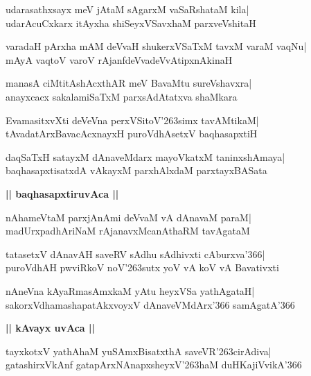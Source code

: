 \documentclass[twoside,12pt,openright]{book}
\def\S{\char'263}
\newcounter{shloka}[chapter]
\def\uvaca#1{\centerline{{\large\textbf{#1}}}}
\begin{document}
\begin{shloka}%
udarasathxsayx meV jAtaM sAgarxM vaSaRshataM kila|\\
udarAcuCxkarx itAyxha shiSeyxVSavxhaM parxveVshitaH
\end{shloka}

\begin{shloka}%
varadaH pArxha mAM deVvaH shukerxVSaTxM tavxM varaM vaqNu|\\
mAyA vaqtoV varoV rAjanfdeVvadeVvAtipxnAkinaH
\end{shloka}

\begin{shloka}%
manasA ciMtitAshAcxthAR meV BavaMtu sureVshavxra|\\
anayxcacx sakalamiSaTxM parxsAdAtatxva shaMkara
\end{shloka}

\begin{shloka}%
EvamasitxvXti deVeVna perxVSitoV\S simx tavAMtikaM|\\
tAvadatArxBavacAcxnayxH puroVdhAsetxV baqhasapxtiH
\end{shloka}

\begin{shloka}%
daqSaTxH satayxM dAnaveMdarx mayoVkatxM taninxshAmaya|\\
baqhasapxtisatxdA vAkayxM parxhAlxdaM parxtayxBASata
\end{shloka}

\uvaca{|| baqhasapxtiruvAca ||}
\begin{shloka}%
nAhameVtaM parxjAnAmi deVvaM vA dAnavaM paraM|\\
madUrxpadhAriNaM rAjanavxMcanAthaRM tavAgataM
\end{shloka}

\begin{shloka}%
tatasetxV dAnavAH saveRV sAdhu sAdhivxti cAburxva\char'366|\\
puroVdhAH pwviRkoV noV\S sutx yoV vA koV vA Bavativxti
\end{shloka}

\begin{shloka}%
nAneVna kAyaRmasAmxkaM yAtu heyxVSa yathAgataH|\\
sakorxVdhamashapatAkxvoyxV dAnaveVMdArx\char'366 samAgatA\char'366
\end{shloka}

\uvaca{|| kAvayx uvAca ||}
\begin{shloka}%
tayxkotxV yathAhaM yuSAmxBisatxthA saveVR\S cirAdiva|\\
gatashirxVkAnf gatapArxNAnapxsheyxV\S haM duHKajiVvikA\char'366
\end{shloka}
\end{document}

